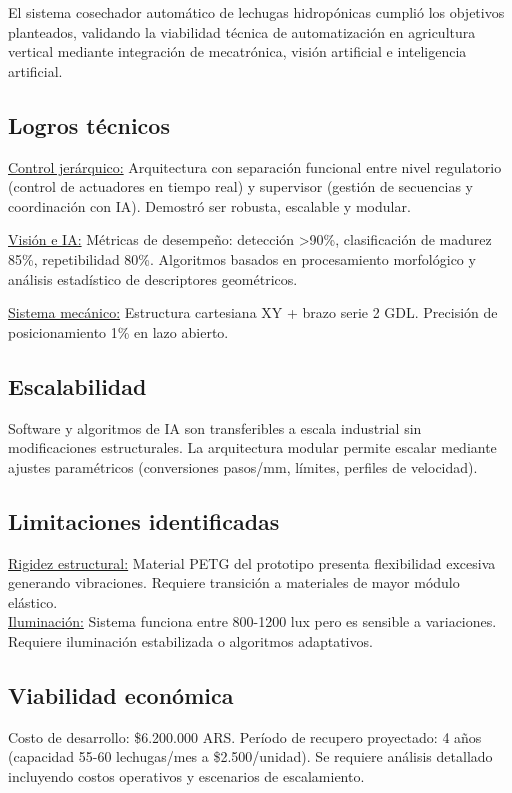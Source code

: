 El sistema cosechador automático de lechugas hidropónicas cumplió los objetivos planteados, validando la viabilidad técnica de automatización en agricultura vertical mediante integración de mecatrónica, visión artificial e inteligencia artificial.

\subsection*{Logros técnicos}

\underline{Control jerárquico:} Arquitectura con separación funcional entre nivel regulatorio (control de actuadores en tiempo real) y supervisor (gestión de secuencias y coordinación con IA). Demostró ser robusta, escalable y modular.

\underline{Visión e IA:} Métricas de desempeño: detección >90\%, clasificación de madurez 85\%, repetibilidad 80\%. Algoritmos basados en procesamiento morfológico y análisis estadístico de descriptores geométricos.

\underline{Sistema mecánico:} Estructura cartesiana XY + brazo serie 2 GDL. Precisión de posicionamiento 1\% en lazo abierto.

\subsection*{Escalabilidad}

Software y algoritmos de IA son transferibles a escala industrial sin modificaciones estructurales. La arquitectura modular permite escalar mediante ajustes paramétricos (conversiones pasos/mm, límites, perfiles de velocidad).

\subsection*{Limitaciones identificadas}

\underline{Rigidez estructural:} Material PETG del prototipo presenta flexibilidad excesiva generando vibraciones. Requiere transición a materiales de mayor módulo elástico.\\

\underline{Iluminación:} Sistema funciona entre 800-1200 lux pero es sensible a variaciones. Requiere iluminación estabilizada o algoritmos adaptativos.

\subsection*{Viabilidad económica}

Costo de desarrollo: \$6.200.000 ARS. Período de recupero proyectado: 4 años (capacidad 55-60 lechugas/mes a \$2.500/unidad). Se requiere análisis detallado incluyendo costos operativos y escenarios de escalamiento.